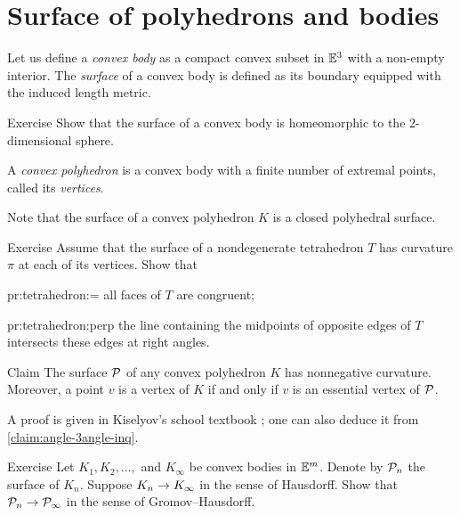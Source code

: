 \section{Surface of polyhedrons and bodies}

Let us define a \emph{convex body} as a compact convex subset in $\mathbb{E}^3$ with a non-empty interior.
The \emph{surface} of a convex body is defined as its boundary equipped with the induced length metric.

\begin{thm}{Exercise}\label{ex:surf-S2}
Show that the surface of a convex body is homeomorphic to the 2-dimensional sphere.
\end{thm}

A \emph{convex polyhedron} is a convex body with a finite number of extremal points, called its \emph{vertices}.

Note that the surface of a convex polyhedron $K$ is a closed polyhedral surface.

\begin{thm}{Exercise}\label{pr:tetrahedron}
Assume that the surface of a nondegenerate tetrahedron $T$ has curvature $\pi$ at each of its vertices.
Show that

\begin{subthm}{pr:tetrahedron:=}
all faces of $T$ are congruent;
\end{subthm}

\begin{subthm}{pr:tetrahedron:perp} the line containing the midpoints of opposite edges of $T$ intersects these edges at right angles.
\end{subthm}

\end{thm}

\begin{thm}{Claim}\label{clm:total-angle}
The surface $\mathcal{P}$ of any convex polyhedron $K$ has nonnegative curvature.
Moreover, a point $v$ is a vertex of $K$ if and only if
$v$ is an essential vertex of $\mathcal{P}$.
\end{thm}

A proof is given in Kiselyov's school textbook \cite[§ 48]{kiselev-stereo-en};
one can also deduce it from \ref{claim:angle-3angle-inq}.

\begin{thm}{Exercise}\label{ex:surface-covergence}
Let $K_1,K_2,\dots,$ and $K_\infty$ be convex bodies in $\mathbb{E}^m$.
Denote by $\mathcal{P}_n$ the surface of $K_n$.
Suppose $K_n\to K_\infty$ in the sense of Hausdorff.
Show that $\mathcal{P}_n\to \mathcal{P}_\infty$ in the sense of Gromov--Hausdorff.
\end{thm}

